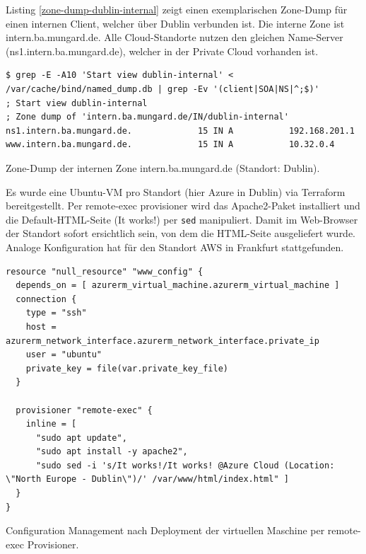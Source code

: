 Listing \ref{zone-dump-dublin-internal} zeigt einen exemplarischen Zone-Dump für einen internen Client, welcher über Dublin verbunden ist. Die interne Zone ist intern.ba.mungard.de. Alle Cloud-Standorte nutzen den gleichen Name-Server (ns1.intern.ba.mungard.de), welcher in der Private Cloud vorhanden ist.\\
\begin{listing}[h]
\begin{verbatim}
$ grep -E -A10 'Start view dublin-internal' < /var/cache/bind/named_dump.db | grep -Ev '(client|SOA|NS|^;$)'
; Start view dublin-internal
; Zone dump of 'intern.ba.mungard.de/IN/dublin-internal'
ns1.intern.ba.mungard.de.             15 IN A           192.168.201.1
www.intern.ba.mungard.de.             15 IN A           10.32.0.4
\end{verbatim}
\caption{Zone-Dump der internen Zone intern.ba.mungard.de (Standort: Dublin).}
\label{zone-dump-dublin-internal}
\end{listing}\FloatBarrier
Es wurde eine Ubuntu-VM pro Standort (hier Azure in Dublin) via Terraform bereitgestellt. Per remote-exec provisioner wird das Apache2-Paket installiert und die Default-HTML-Seite (\glqq It works!\grqq{}) per \texttt{sed} manipuliert. Damit im Web-Browser der Standort sofort ersichtlich sein, von dem die HTML-Seite ausgeliefert wurde. Analoge Konfiguration hat für den Standort AWS in Frankfurt stattgefunden.
\begin{listing}[h]
\begin{verbatim}
resource "null_resource" "www_config" {
  depends_on = [ azurerm_virtual_machine.azurerm_virtual_machine ]
  connection {
    type = "ssh"
    host = azurerm_network_interface.azurerm_network_interface.private_ip
    user = "ubuntu"
    private_key = file(var.private_key_file)
  }

  provisioner "remote-exec" {
    inline = [
      "sudo apt update",
      "sudo apt install -y apache2",
      "sudo sed -i 's/It works!/It works! @Azure Cloud (Location: \"North Europe - Dublin\")/' /var/www/html/index.html" ]
  }
}
\end{verbatim}
\caption{Configuration Management nach \gls{Deployment} der virtuellen Maschine per remote-exec Provisioner.}
\label{sed-replace-apache-location}
\end{listing}\FloatBarrier

